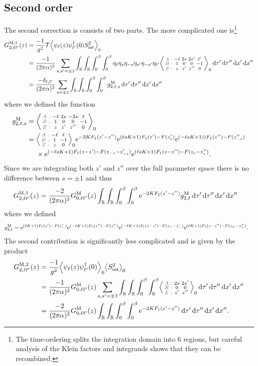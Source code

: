 \documentclass[english, parskip=full]{scrartcl}
\begin{document}
\subsection{Second order}
The second correction is consists of two parts.
The more complicated one is\footnote{The time-ordering splits the integration domain into 6 regions, but careful analysis of the Klein factors and integrands shows that they can be recombined.}
\begin{align}
G_{2,\ell\ell'}^{\M,1}(z) &= \frac{-1}{g^2}\mathcal{T}\bra*{\psi_\ell(z)\psi_{\ell'}^\dagger(0) S_\Text{int}^2}_0\\
&= \frac{-1}{(2\pi\alpha)^3} \sum_{s,s'=\pm 1} \intr{\intr{ \intx{0}{\beta}{\intx{0}{\beta}{\eta_{\ell}\eta_{s} \eta_{-s}\eta_{s'} \eta_{-s'} \eta_{\ell'} \bra*{\zabx{-\ell & 2s & 2s' & \ell'}{1 & 0 & 0 & -1}{z& z' & z'' & 0}}_0}{\tau'}}{\tau''}  }{x'} }{x''}\\
&= \frac{-\delta_{\ell,\ell'}}{(2\pi\alpha)^3} \sum_{s=\pm 1} \intr{\intr{\intx{0}{\beta}{\intx{0}{\beta}{ g_{2,\ell,s}^\M }{\tau'}}{\tau''}}{x'} }{x''}
\end{align}
where we defined the function
\begin{align}
g_{2,\ell,s}^\M &= \bra*{\zabx{-\ell & 2s & -2s & \ell}{1&0&0&-1}{z&z'&z''&0}}_0\\
&= \bsplit{&\bra*{\zabx{-\ell & \ell}{1&-1}{z&0}}_0 \powe{-2KF_1(z'-z'')} \powe{(\ell sK+1)F_1(z') - F(z_s')} \powe{(-\ell sK+1))F_1(z'') - F(z_{-s}'')}\\
&\times\powe{(-\ell sK+1)F_1(z-z')-F(z_{-s} - z_{-s}')} \powe{(\ell sK+1)F_1(z-z'')-F(z_{s} - z_{s}'')}.}
\end{align}
Since we are integrating both $z'$ and $z''$ over the full parameter space there is no difference between $s=\pm1$ and thus
\begin{align}
G_{2,\ell\ell'}^{\text{M},1}(z) &= \frac{-2}{(2\pi\alpha)^2} G_{0,\ell\ell'}^{\text{M}}(z) \int_{\mathbb{R}} \int_{\mathbb{R}} \int_{0}^{\beta} \int_{0}^{\beta}  \text{e}^{-2KF_1(z'-z'')} g_{2,\ell}^{\text{M}}  \,\mathrm{d}\tau' \,\mathrm{d}\tau'' \, \mathrm{d}x'  \, \mathrm{d}x''
\end{align}
where we defined
\begin{align}
g_{2,\ell}^{\text{M}} &= \text{e}^{(\ell K+1)F_1(z') - F(z_-')} \text{e}^{(-\ell K+1)F_1(z'') - F(z_{-}'')} \text{e}^{(-\ell K+1)F_1(z-z')-F(z_{-} - z_{-}')} \text{e}^{(\ell K+1)F_1(z-z'')-F(z_{+} - z_{+}'')}.
\end{align}
The second contribution is significantly less complicated and is given by the product
\begin{align}
G_{2,\ell\ell'}^{\M,2}(z) &= \frac{-1}{g^2} \bra*{\psi_\ell(z) \psi_{\ell'}^\dagger(0)}_0 \bra*{S_\Text{int}^2}_0\\
&= \frac{-1}{(2\pi\alpha)^2} G_{0,\ell\ell'}^\M(z) \sum_{s,s'=\pm 1} \intr{\intr{\intx{0}{\beta}{\intx{0}{\beta}{ \bra*{\zabx{2s&2s'}{0&0}{z'&z''}}_0 }{\tau'}}{\tau''}}{x'} }{x''}\\
&= \frac{-2}{(2\pi\alpha)^2}G_{0,\ell\ell'}^\M(z) \intr{\intr{\intx{0}{\beta}{\intx{0}{\beta}{ \powe{-2KF_1(z'-z'')} }{\tau'}}{\tau''}}{x'} }{x''}.
\end{align}
\end{document}
